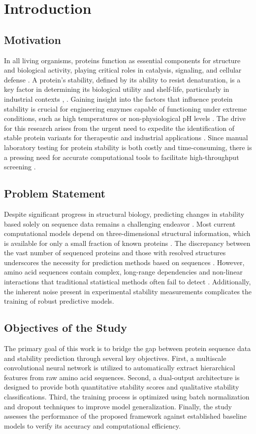 \documentclass[conference]{IEEEtran}
\begin{document}
\section{Introduction}
\subsection{Motivation}
In all living organisms, proteins function as essential components for structure and biological activity, playing critical roles in catalysis, signaling, and cellular defense \cite{b1}. A protein's stability, defined by its ability to resist denaturation, is a key factor in determining its biological utility and shelf-life, particularly in industrial contexts \cite{b2}, \cite{b3}. Gaining insight into the factors that influence protein stability is crucial for engineering enzymes capable of functioning under extreme conditions, such as high temperatures or non-physiological pH levels \cite{b4}. The drive for this research arises from the urgent need to expedite the identification of stable protein variants for therapeutic and industrial applications \cite{b5}. Since manual laboratory testing for protein stability is both costly and time-consuming, there is a pressing need for accurate computational tools to facilitate high-throughput screening \cite{b6}.

\subsection{Problem Statement}
Despite significant progress in structural biology, predicting changes in stability based solely on sequence data remains a challenging endeavor \cite{b7}. Most current computational models depend on three-dimensional structural information, which is available for only a small fraction of known proteins \cite{b8}. The discrepancy between the vast number of sequenced proteins and those with resolved structures underscores the necessity for prediction methods based on sequences \cite{b9}. However, amino acid sequences contain complex, long-range dependencies and non-linear interactions that traditional statistical methods often fail to detect \cite{b10}. Additionally, the inherent noise present in experimental stability measurements complicates the training of robust predictive models.

\subsection{Objectives of the Study}
The primary goal of this work is to bridge the gap between protein sequence data and stability prediction through several key objectives. First, a multiscale convolutional neural network is utilized to automatically extract hierarchical features from raw amino acid sequences. Second, a dual-output architecture is designed to provide both quantitative stability scores and qualitative stability classifications. Third, the training process is optimized using batch normalization and dropout techniques to improve model generalization. Finally, the study assesses the performance of the proposed framework against established baseline models to verify its accuracy and computational efficiency.
\end{document}
